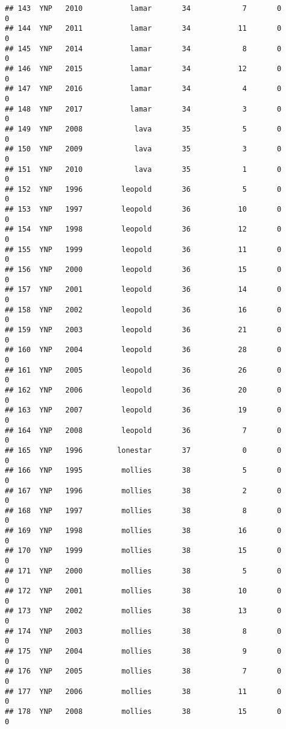 \documentclass[
]{article}
\begin{document}
\begin{verbatim}
## 143  YNP   2010           lamar       34            7       0        0
## 144  YNP   2011           lamar       34           11       0        0
## 145  YNP   2014           lamar       34            8       0        0
## 146  YNP   2015           lamar       34           12       0        0
## 147  YNP   2016           lamar       34            4       0        0
## 148  YNP   2017           lamar       34            3       0        0
## 149  YNP   2008            lava       35            5       0        0
## 150  YNP   2009            lava       35            3       0        0
## 151  YNP   2010            lava       35            1       0        0
## 152  YNP   1996         leopold       36            5       0        0
## 153  YNP   1997         leopold       36           10       0        0
## 154  YNP   1998         leopold       36           12       0        0
## 155  YNP   1999         leopold       36           11       0        0
## 156  YNP   2000         leopold       36           15       0        0
## 157  YNP   2001         leopold       36           14       0        0
## 158  YNP   2002         leopold       36           16       0        0
## 159  YNP   2003         leopold       36           21       0        0
## 160  YNP   2004         leopold       36           28       0        0
## 161  YNP   2005         leopold       36           26       0        0
## 162  YNP   2006         leopold       36           20       0        0
## 163  YNP   2007         leopold       36           19       0        0
## 164  YNP   2008         leopold       36            7       0        0
## 165  YNP   1996        lonestar       37            0       0        0
## 166  YNP   1995         mollies       38            5       0        0
## 167  YNP   1996         mollies       38            2       0        0
## 168  YNP   1997         mollies       38            8       0        0
## 169  YNP   1998         mollies       38           16       0        0
## 170  YNP   1999         mollies       38           15       0        0
## 171  YNP   2000         mollies       38            5       0        0
## 172  YNP   2001         mollies       38           10       0        0
## 173  YNP   2002         mollies       38           13       0        0
## 174  YNP   2003         mollies       38            8       0        0
## 175  YNP   2004         mollies       38            9       0        0
## 176  YNP   2005         mollies       38            7       0        0
## 177  YNP   2006         mollies       38           11       0        0
## 178  YNP   2008         mollies       38           15       0        0

\end{verbatim}
\end{document}
